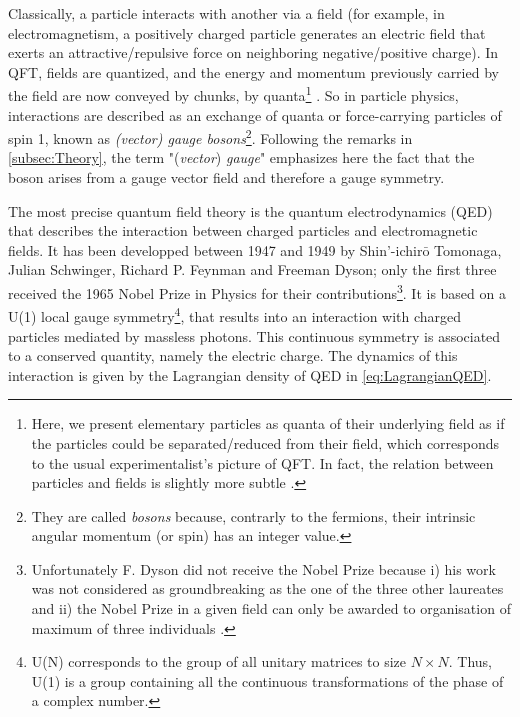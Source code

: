Classically, a particle interacts with another via a field (for example, in electromagnetism, a positively charged particle generates an electric field that exerts an attractive/repulsive force on neighboring negative/positive charge). In QFT, fields are quantized, and the energy and momentum previously carried by the field are now conveyed by chunks, by quanta\footnote{Here, we present elementary particles as quanta  of their underlying field as if the particles could be separated/reduced from their field, which corresponds to the usual experimentalist's picture of QFT. In fact, the relation between particles and fields is slightly more subtle \cite{jaegerElementaryParticlesQuantum2021}.} \cite{serwayModernPhysics2004}. So in particle physics, interactions are described as an exchange of quanta or force-carrying particles of spin 1, known as \textit{(vector) gauge bosons}\footnote{They are called \textit{bosons} because, contrarly to the fermions, their intrinsic angular momentum (or spin) has an integer value.}\cite{braibantParticlesFundamentalInteractions2012}\cite{thomsonModernParticlePhysics2013}. Following the remarks in \Sec\ref{subsec:Theory}, the term "(\textit{vector}) \textit{gauge}" emphasizes here the fact that the boson arises from a gauge vector field and therefore a gauge symmetry. 

The most precise quantum field theory is the quantum electrodynamics (QED) that describes the interaction between charged particles and electromagnetic fields. It has been developped between 1947 and 1949 by Shin'-ichir$\bar{\text{o}}$ Tomonaga, Julian Schwinger, Richard P. Feynman and Freeman Dyson; only the first three received the 1965 Nobel Prize in Physics for their contributions\footnote{Unfortunately F. Dyson did not receive the Nobel Prize because i) his work was not considered as groundbreaking as the one of the three other laureates and ii) the Nobel Prize in a given field can only be awarded to organisation of maximum of three individuals \cite{schmidhuberEvolutionNationalNobel2010}.}. It is based on a U(1) local gauge symmetry\footnote{U(N) corresponds to the group of all unitary matrices to size $N \times N$. Thus, U(1) is a group containing all the continuous transformations of the phase of a complex number.}, that results into an interaction with charged particles mediated by massless photons. This continuous symmetry is associated to a conserved quantity, namely the electric charge. The dynamics of this interaction is given by the Lagrangian density of QED in \eq\ref{eq:LagrangianQED}.

